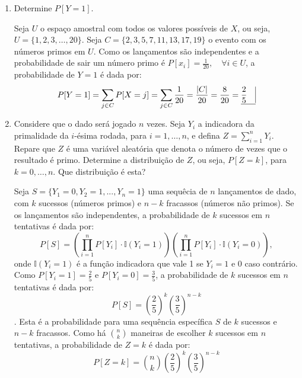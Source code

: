 \documentclass[12 pt]{article}
\begin{document}
\begin{enumerate}
    \item Determine $P [Y = 1]$.
    \begin{tcolorbox}[colframe=black, title=Resposta:]
        Seja $U$ o espaço amostral com todos os valores possíveis de $X$, ou seja, $U = \{1, 2, 3, \dots, 20\}$. Seja $C=\{2, 3, 5, 7, 11, 13, 17, 19\}$ o evento com os números primos em $U$. Como os lançamentos são independentes e a probabilidade de sair um número primo é $P[x_i] = \frac{1}{20}, \quad \forall i \in U$, a probabilidade de $Y = 1$ é dada por:
        $$P[Y = 1] = \sum_{j \in C} P[X = j] = \sum_{j \in C} \frac{1}{20} = \frac{|C|}{20} = \frac{8}{20} = \underline{\frac{2}{5} \quad \vline}$$
    \end{tcolorbox}
    \newpage
    \item Considere que o dado será jogado $n$ vezes. Seja $Y_i$ a indicadora da primalidade da $i$-ésima rodada, para $i = 1, \dots, n$, e defina $Z = \sum_{i=1}^{n} Y_i$. Repare que $Z$ é uma variável aleatória que denota o número de vezes que o resultado é primo. Determine a distribuição de $Z$, ou seja, $P [Z = k]$, para $k = 0, \dots, n$. Que distribuição é esta?
    \begin{tcolorbox}[colframe=black, title=Resposta:]
        Seja $S=\{Y_1=0, Y_2=1, ..., Y_n=1\}$ uma sequêcia de $n$ lançamentos de dado, com $k$ sucessos (números primos) e $n-k$ fracassos (números não primos). Se os lançamentos são independentes, a probabilidade de $k$ sucessos em $n$ tentativas é dada por:
        $$P[S] = \left(\prod_{i=1}^{n} P[Y_i] \cdot \mathbb{I}(Y_i = 1) \right) \left(\prod_{i=1}^{n} P[Y_i] \cdot \mathbb{I}(Y_i = 0) \right),$$
        onde $\mathbb{I}(Y_i = 1)$ é a função indicadora que vale 1 se $Y_i = 1$ e 0 caso contrário. Como $P[Y_i = 1] = \frac{2}{5}$ e $P[Y_i = 0] = \frac{3}{5}$, a probabilidade de $k$ sucessos em $n$ tentativas é dada por:
        $$P[S] = \left(\frac{2}{5}\right)^k \left(\frac{3}{5}\right)^{n-k}$$.
        Esta é a probabilidade para uma sequência específica $S$ de $k$ sucessos e $n-k$ fracassos. Como há $\binom{n}{k}$ maneiras de escolher $k$ sucessos em $n$ tentativas, a probabilidade de $Z = k$ é dada por:
        $$\boxed{P[Z = k] = \binom{n}{k} \left(\frac{2}{5}\right)^k \left(\frac{3}{5}\right)^{n-k}}$$


\end{tcolorbox}
\end{enumerate}
\end{document}
